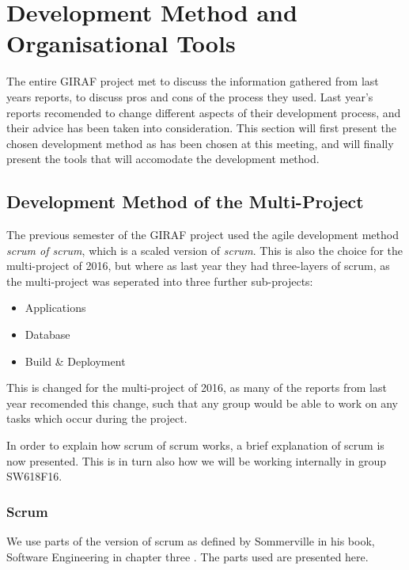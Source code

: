 \section{Development Method and Organisational Tools}
The entire GIRAF project met to discuss the information gathered from last years reports, to discuss pros and cons of the process they used.
Last year's reports recomended to change different aspects of their development process, and their advice has been taken into consideration.
This section will first present the chosen development method as has been chosen at this meeting, and will finally present the tools that will accomodate the development method.


\subsection*{Development Method of the Multi-Project}
The previous semester of the GIRAF project used the agile development method \textit{scrum of scrum}, which is a scaled version of \textit{scrum}.
This is also the choice for the multi-project of 2016, but where as last year they had three-layers of scrum, as the multi-project was seperated into three further sub-projects:
\begin{itemize}
	\item Applications
	\item Database
	\item Build & Deployment
\end{itemize}

This is changed for the multi-project of 2016, as many of the reports from last year recomended this change, such that any group would be able to work on any tasks which occur during the project.

In order to explain how scrum of scrum works, a brief explanation of scrum is now presented.
This is in turn also how we will be working internally in group SW618F16. 


\subsubsection*{Scrum}

We use parts of the version of scrum as defined by Sommerville in his book, Software Engineering in chapter three \cite{SEBOOK}.
The parts used are presented here.

